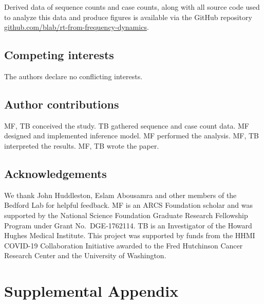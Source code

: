 \documentclass[11pt,oneside,letterpaper]{article}
\begin{document}

Derived data of sequence counts and case counts, along with all source code used to analyze this data and produce figures is available via the GitHub repository \href{https://github.com/blab/rt-from-frequency-dynamics/}{github.com/blab/rt-from-frequency-dynamics}.

\subsection*{Competing interests}%

The authors declare no conflicting interests.

\subsection*{Author contributions}

MF, TB conceived the study.
TB gathered sequence and case count data.
MF designed and implemented inference model.
MF performed the analysis.
MF, TB interpreted the results.
MF, TB wrote the paper.

\subsection*{Acknowledgements}%

We thank John Huddleston, Eslam Abousamra and other members of the Bedford Lab for helpful feedback.
MF is an ARCS Foundation scholar and was supported by the National Science Foundation Graduate Research Fellowship Program under Grant No.\ DGE-1762114.
TB is an Investigator of the Howard Hughes Medical Institute.
This project was supported by funds from the HHMI COVID-19 Collaboration Initiative awarded to the Fred Hutchinson Cancer Research Center and the University of Washington.




\newpage

\appendix

\setcounter{figure}{0}
\setcounter{table}{0}
\setcounter{page}{1}
\renewcommand{\thefigure}{S\arabic{figure}}
\renewcommand{\thetable}{S\arabic{table}}
\renewcommand{\thepage}{S\arabic{page}}

\section*{Supplemental Appendix}
\end{document}
